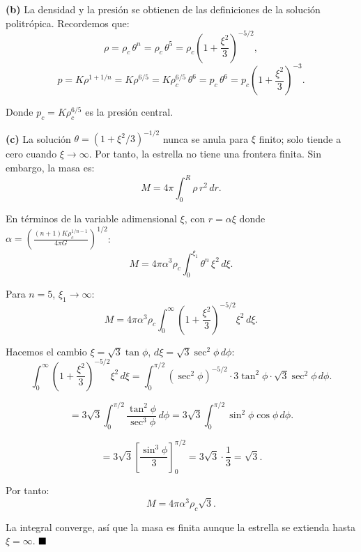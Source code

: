 \vspace{0.5em}

\noindent\textbf{(b)} La densidad y la presión se obtienen de las definiciones de la solución politrópica. Recordemos que:
$$
\rho = \rho_c\,\theta^n = \rho_c\,\theta^5 = \rho_c\left(1+\frac{\xi^2}{3}\right)^{-5/2},
$$
$$
p = K\rho^{1+1/n} = K\rho^{6/5} = K\rho_c^{6/5}\,\theta^6 = p_c\,\theta^6 = p_c\left(1+\frac{\xi^2}{3}\right)^{-3}.
$$

Donde $p_c = K\rho_c^{6/5}$ es la presión central.

\vspace{0.5em}

\noindent\textbf{(c)} La solución $\theta = (1+\xi^2/3)^{-1/2}$ nunca se anula para $\xi$ finito; solo tiende a cero cuando $\xi \to \infty$. Por tanto, la estrella no tiene una frontera finita. Sin embargo, la masa es:
$$
M = 4\pi\int_0^R \rho\, r^2\, dr.
$$

En términos de la variable adimensional $\xi$, con $r = \alpha\xi$ donde $\alpha = \left(\frac{(n+1)K\rho_c^{1/n-1}}{4\pi G}\right)^{1/2}$:
$$
M = 4\pi\alpha^3\rho_c\int_0^{\xi_1}\theta^n\,\xi^2\,d\xi.
$$

Para $n=5$, $\xi_1 \to \infty$:
$$
M = 4\pi\alpha^3\rho_c\int_0^{\infty}\left(1+\frac{\xi^2}{3}\right)^{-5/2}\xi^2\,d\xi.
$$

Hacemos el cambio $\xi = \sqrt{3}\tan\phi$, $d\xi = \sqrt{3}\sec^2\phi\, d\phi$:
$$
\int_0^{\infty}\left(1+\frac{\xi^2}{3}\right)^{-5/2}\xi^2\,d\xi = \int_0^{\pi/2}(\sec^2\phi)^{-5/2}\cdot 3\tan^2\phi\cdot\sqrt{3}\sec^2\phi\, d\phi.
$$

$$
= 3\sqrt{3}\int_0^{\pi/2}\frac{\tan^2\phi}{\sec^3\phi}\,d\phi = 3\sqrt{3}\int_0^{\pi/2}\sin^2\phi\cos\phi\, d\phi.
$$

$$
= 3\sqrt{3}\left[\frac{\sin^3\phi}{3}\right]_0^{\pi/2} = 3\sqrt{3}\cdot\frac{1}{3} = \sqrt{3}.
$$

Por tanto:
$$
M = 4\pi\alpha^3\rho_c\sqrt{3}.
$$

La integral converge, así que la masa es finita aunque la estrella se extienda hasta $\xi = \infty$. $\hfill\blacksquare$
